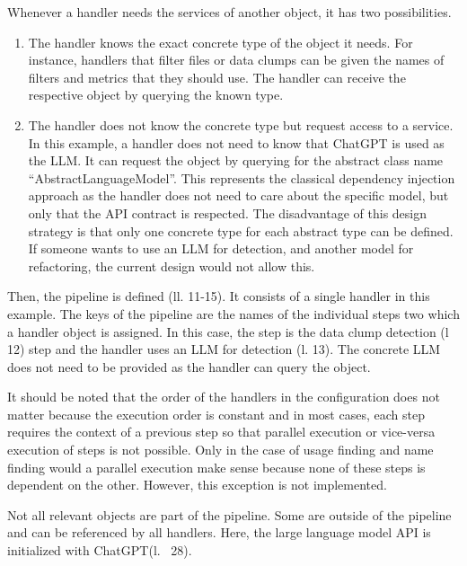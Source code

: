 Whenever a handler needs the services of another object, it has two possibilities.
\begin{enumerate}
    \item The handler knows the exact concrete type of the object it needs. For instance, handlers that filter files or data clumps can be given the names of filters and metrics that they should use. The handler can receive the respective object by querying the known type. 

    \item The handler does not know the concrete type but request access to a service. In this example, a handler does not need to know that ChatGPT is used as the \ac{LLM}. It can request the object by querying for the abstract class name \enquote{AbstractLanguageModel}. This represents the classical dependency injection approach as the handler does not need to care about the specific model, but only that the \ac{API} contract is respected. The disadvantage of this design strategy is that only one  concrete type for each abstract type can be defined. If someone wants to use an \ac{LLM} for detection, and another model for refactoring, the current design would not allow this. 
\end{enumerate}




Then, the pipeline is defined (ll. 11-15). It consists of a single handler in this example. The keys of the pipeline are the names of the individual steps two which a handler object is assigned. In this case, the step is the data clump detection (l 12) step and the  handler uses an \ac{LLM} for detection (l. 13). The concrete \ac{LLM} does not need to be provided as the handler can query the object. 


It should be noted that the order of the handlers in the configuration  does not matter because the execution order is constant and in most cases, each step requires the context of a previous step so that parallel execution or vice-versa execution of steps is not possible. Only in the case of usage finding and name finding would a parallel execution make sense because none of these steps is dependent on the other.  However, this exception is not implemented.

Not all relevant objects are part of the pipeline. Some are outside of the pipeline and can be referenced by all handlers. Here, the large language model \ac{API} is initialized with ChatGPT(l.~ 28).

